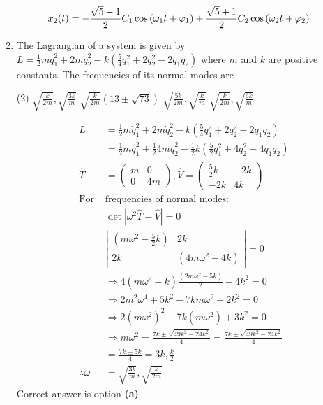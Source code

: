 \begin{enumerate}
\begin{answer}
\begin{align}
		x_{2}(t)&=-\frac{\sqrt{5}-1}{2} C_{1} \cos \left(\omega_{1} t+\varphi_{1}\right)+\frac{\sqrt{5}+1}{2} C_{2} \cos \left(\omega_{2} t+\varphi_{2}\right)\notag
		\end{align}
	\end{answer}
	\item  The Lagrangian of a system is given by $L=\frac{1}{2} m \dot{q}_{1}^{2}+2 m \dot{q}_{2}^{2}-k\left(\frac{5}{4} q_{1}^{2}+2 q_{2}^{2}-2 q_{1} q_{2}\right)$ where $m$ and $k$ are positive constants. The frequencies of its normal modes are
 \begin{tasks}(2)
	\task[\textbf{a.}]$\sqrt{\frac{k}{2 m}}, \sqrt{\frac{3 k}{m}}$
	\task[\textbf{b.}]$\sqrt{\frac{k}{2 m}}(13 \pm \sqrt{73})$
	\task[\textbf{c.}]$\sqrt{\frac{5 k}{2 m}}, \sqrt{\frac{k}{m}}$
	\task[\textbf{d.}]  $\sqrt{\frac{k}{2 m}}, \sqrt{\frac{6 k}{m}}$
\end{tasks}
	\begin{answer}
		\begin{align*}
		 L &=\frac{1}{2} m \dot{q}_{1}^{2}+2 m \dot{q}_{2}^{2}-k\left(\frac{5}{4} q_{1}^{2}+2 q_{2}^{2}-2 q_{1} q_{2}\right) \\ &=\frac{1}{2} m \dot{q}_{1}^{2}+\frac{1}{2} 4 m \dot{q}_{2}^{2}-\frac{1}{2} k\left(\frac{5}{2} q_{1}^{2}+4 q_{2}^{2}-4 q_{1} q_{2}\right) \\ \hat{T} &=\left(\begin{array}{cc}m & 0 \\ 0 & 4 m\end{array}\right), \hat{V}=\left(\begin{array}{cc}\frac{5}{2} k & -2 k \\ -2 k & 4 k\end{array}\right) \\
		 \text{For }&\text{frequencies of normal modes:}\\
		 &\operatorname{det}\left|\omega^{2} \hat{T}-\hat{V}\right|=0\\
		 &\left|\begin{array}{cc}\left(m \omega^{2}-\frac{5}{2} k\right) & 2 k \\ 2 k & \left(4 m \omega^{2}-4 k\right)\end{array}\right|=0 \\
		 &\Rightarrow 4\left(m \omega^{2}-k\right) \frac{\left(2 m \omega^{2}-5 k\right)}{2}-4 k^{2}=0\\
		 &\Rightarrow 2 m^{2} \omega^{4}+5 k^{2}-7 k m \omega^{2}-2 k^{2}=0\\
		 &\Rightarrow 2\left(m \omega^{2}\right)^{2}-7 k\left(m \omega^{2}\right)+3 k^{2}=0\\
		 &\Rightarrow m \omega^{2}=\frac{7 k \pm \sqrt{49 k^{2}-24 k^{2}}}{4}=\frac{7 k \pm \sqrt{49 k^{2}-24 k^{2}}}{4}\\
		 &=\frac{7 k \pm 5 k}{4}=3 k, \frac{k}{2}\\
		 \therefore \omega&=\sqrt{\frac{3 k}{m}}, \sqrt{\frac{k}{2 m}}
		\end{align*}
		 Correct answer is option \textbf{(a)}
	\end{answer}
\end{enumerate}
